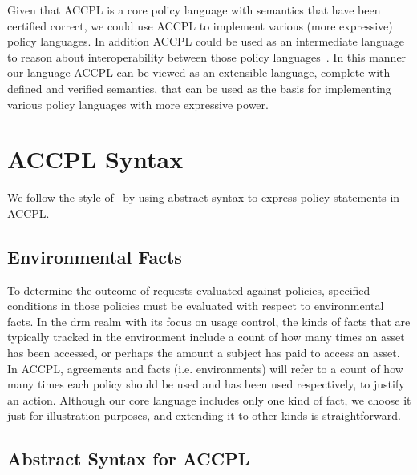 \documentclass[conference]{IEEEtran}
\begin{document}
Given that \ac{ACCPL} is a core policy language with semantics that have been certified correct, we could use \ac{ACCPL} to implement various (more expressive) policy languages. In addition \ac{ACCPL} could be used as an intermediate language to reason about interoperability between those policy languages~\cite{prados2005interoperability,maronas2009architecture}. In this manner our language \ac{ACCPL} can be viewed as an extensible language, complete with defined and verified semantics, that can be used as the basis for implementing various policy languages with more expressive power. 


\section{ACCPL Syntax}

We follow the style of~\cite{pucella2006} by using abstract syntax to express policy statements in \ac{ACCPL}. 

\subsection{Environmental Facts}\label{sec:odrl0}
To determine the outcome of requests evaluated against policies,
specified conditions in those policies must be evaluated with respect
to environmental facts. In the \ac{drm} realm with its focus on usage
control, the kinds of facts that are typically tracked in the
environment include a count of how many times an asset has been
accessed, or perhaps the amount a subject has paid to access an asset. In \ac{ACCPL}, agreements and facts (i.e. environments) will
refer to a count of how many times each policy should be used and has
been used respectively, to justify an action.
Although our core language includes only one kind of fact, we choose
it just for illustration purposes, and extending it to other kinds is
straightforward.

\subsection{Abstract Syntax for ACCPL} \label{sec:productionast}

\newcommand*{\Comment}[1]{\hfill\makebox[7.0cm][l]{#1}}%
\newcommand*{\CommentPP}[1]{\hfill\makebox[7.0cm][l]{#1}}%
\end{document}
